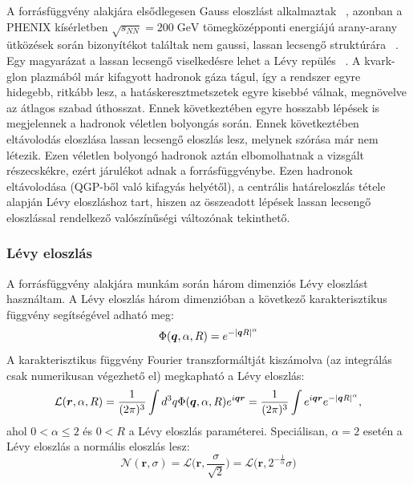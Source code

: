 \documentclass[10pt,a4paper]{article}
\numberwithin{equation}{subsection}
\numberwithin{figure}{section}
\begin{document}


A forrásfüggvény alakjára elsődlegesen Gauss eloszlást alkalmaztak ~\cite{Csorgo:2005gd, Lisa:2005dd}, azonban a PHENIX kísérletben $\sqrt{s_{NN}}=200\;\mathrm{GeV}$ tömegközépponti energiájú arany-arany ütközések során bizonyítékot találtak nem gaussi, lassan lecsengő struktúrára ~\cite{Adler:2006as}. Egy magyarázat a lassan lecsengő viselkedésre lehet a Lévy repülés ~\cite{Csanad:2007fr}. A kvark-glon plazmából már kifagyott hadronok gáza tágul, így a rendszer egyre hidegebb, ritkább lesz, a hatáskeresztmetszetek egyre kisebbé válnak, megnövelve az átlagos szabad úthosszat. Ennek következtében egyre hosszabb lépések is megjelennek a hadronok véletlen bolyongás során. Ennek következtében eltávolodás eloszlása lassan lecsengő eloszlás lesz, melynek szórása már nem létezik. Ezen véletlen bolyongó hadronok aztán elbomolhatnak a vizsgált részecskékre, ezért járulékot adnak a forrásfüggvénybe. Ezen hadronok eltávolodása (QGP-ből való kifagyás helyétől), a centrális határeloszlás tétele alapján Lévy eloszláshoz tart, hiszen az összeadott lépések lassan lecsengő eloszlással rendelkező valószínűségi változónak tekinthető.

\subsubsection{Lévy eloszlás}

A forrásfüggvény alakjára munkám során három dimenziós Lévy eloszlást használtam. A Lévy eloszlás három dimenzióban a következő karakterisztikus függvény segítségével adható meg:
\begin{equation}
\Phi(\bm{q}, \alpha, R) = e^{-\abs{\bm{q}R}^\alpha}
\end{equation}
A karakterisztikus függvény Fourier transzformáltját kiszámolva (az integrálás csak numerikusan végezhető el) megkapható a Lévy eloszlás:
\begin{equation}
\mathcal{L}(\bm{r},\alpha,R) = \frac{1}{(2\pi)^3}\int d^3q \Phi(\bm{q}, \alpha, R)e^{i\bm{qr}}= \frac{1}{(2\pi)^3}\int e^{i\bm{qr}}e^{-\abs{\bm{q}R}^\alpha},
 \label{eq:Levyint}
\end{equation}
\noindent
ahol $0< \alpha \leq 2$ és $0<R$ a Lévy eloszlás paraméterei. Speciálisan, $\alpha=2$ esetén a Lévy eloszlás a normális eloszlás lesz:
\begin{equation}
\mathcal{N}(\bm{r},\sigma) = \mathcal{L}\bigg(\bm{r}, \frac{\sigma}{\sqrt{2}}\bigg) = \mathcal{L}\big(\bm{r}, 2^{-\frac{1}{\alpha}}\sigma\big)
\end{equation}
\end{document}
